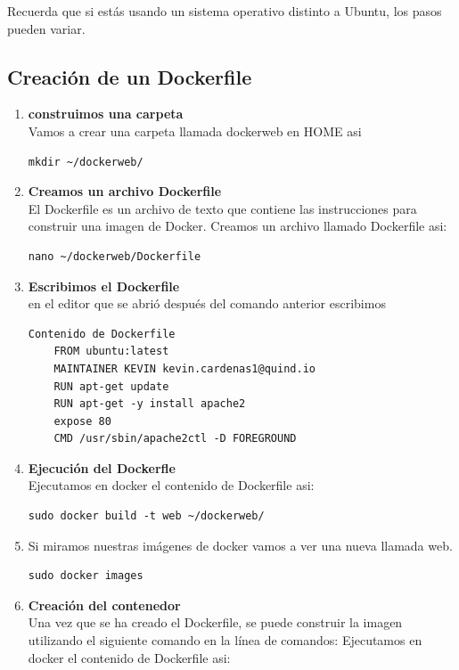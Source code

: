 \documentclass{article}
\begin{document}
Recuerda que si estás usando un sistema operativo distinto a Ubuntu, los pasos pueden variar.
\subsection{Creación de un Dockerfile}
\begin{enumerate}
\item\textbf{construimos una carpeta}\\ 
     Vamos a crear una carpeta llamada dockerweb en HOME asi
\begin{lstlisting}[numbers=none]
    mkdir ~/dockerweb/\end{lstlisting}
\item \textbf{Creamos un archivo Dockerfile}\\ 
     El Dockerfile es un archivo de texto que contiene las instrucciones para construir una imagen de Docker. Creamos un archivo llamado Dockerfile asi:
\begin{lstlisting}[numbers=none]
    nano ~/dockerweb/Dockerfile\end{lstlisting}
    \item \textbf{Escribimos el Dockerfile}\\ 
    en el editor que se abrió después del comando anterior escribimos
    \begin{lstlisting}[numbers=none]
    Contenido de Dockerfile
    FROM ubuntu:latest
    MAINTAINER KEVIN kevin.cardenas1@quind.io
    RUN apt-get update
    RUN apt-get -y install apache2
    expose 80
    CMD /usr/sbin/apache2ctl -D FOREGROUND\end{lstlisting}
    \item \textbf{Ejecución del Dockerfle} \\ 
    Ejecutamos en docker el contenido de Dockerfile asi:
    \begin{lstlisting}[numbers=none]
    sudo docker build -t web ~/dockerweb/\end{lstlisting}
    \item Si miramos nuestras imágenes de docker vamos a ver una nueva llamada web.
    \begin{lstlisting}[numbers=none]
    sudo docker images\end{lstlisting}
    \item \textbf{Creación del contenedor}\\ 
     Una vez que se ha creado el Dockerfile, se puede construir la imagen utilizando el siguiente comando en la línea de comandos:
    Ejecutamos en docker el contenido de Dockerfile asi:

\end{enumerate}
\end{document}
